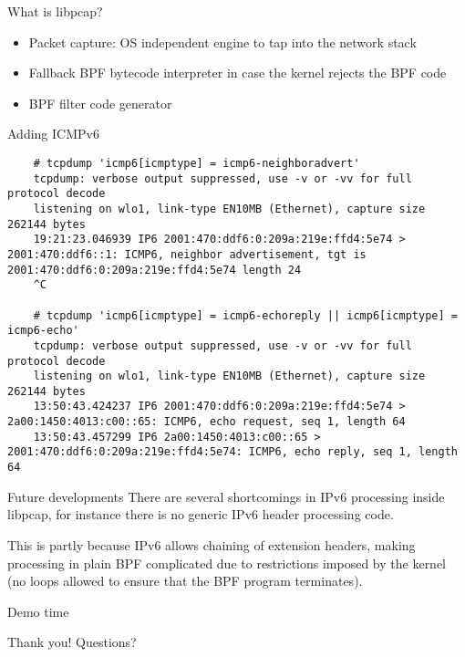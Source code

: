 \documentclass{beamer}
\begin{document}
  \begin{frame}{What is libpcap?}
    \begin{itemize}
      \item Packet capture: OS independent engine to tap into the network stack
      \item Fallback BPF bytecode interpreter in case the kernel rejects the BPF code
      \item BPF filter code generator
    \end{itemize}
  \end{frame}

  \begin{frame}[fragile]{Adding ICMPv6}
    \begin{verbatim}
    # tcpdump 'icmp6[icmptype] = icmp6-neighboradvert'
    tcpdump: verbose output suppressed, use -v or -vv for full protocol decode
    listening on wlo1, link-type EN10MB (Ethernet), capture size 262144 bytes
    19:21:23.046939 IP6 2001:470:ddf6:0:209a:219e:ffd4:5e74 > 2001:470:ddf6::1: ICMP6, neighbor advertisement, tgt is 2001:470:ddf6:0:209a:219e:ffd4:5e74 length 24
    ^C

    # tcpdump 'icmp6[icmptype] = icmp6-echoreply || icmp6[icmptype] = icmp6-echo'
    tcpdump: verbose output suppressed, use -v or -vv for full protocol decode
    listening on wlo1, link-type EN10MB (Ethernet), capture size 262144 bytes
    13:50:43.424237 IP6 2001:470:ddf6:0:209a:219e:ffd4:5e74 > 2a00:1450:4013:c00::65: ICMP6, echo request, seq 1, length 64
    13:50:43.457299 IP6 2a00:1450:4013:c00::65 > 2001:470:ddf6:0:209a:219e:ffd4:5e74: ICMP6, echo reply, seq 1, length 64
    \end{verbatim}
  \end{frame}

  \begin{frame}[fragile]{Future developments}
    There are several shortcomings in IPv6 processing inside libpcap, for
    instance there is no generic IPv6 header processing code.

    This is partly because IPv6 allows chaining of extension headers, making
    processing in plain BPF complicated due to restrictions imposed by the
    kernel (no loops allowed to ensure that the BPF program terminates).
  \end{frame}

  \begin{frame}[standout]
    Demo time
  \end{frame}
  \begin{frame}{Thank you!}
  Questions?
  \end{frame}
\end{document}
